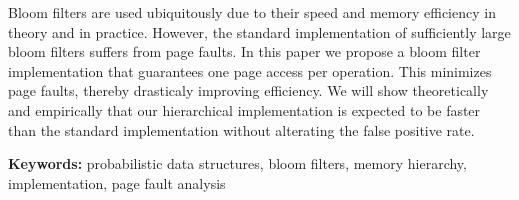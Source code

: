 Bloom filters \cite{Bloom} are used ubiquitously due to their speed and memory efficiency in theory and in practice.
However, the standard implementation of sufficiently large bloom filters suffers from page faults.
In this paper we propose a bloom filter implementation that guarantees one page access per operation. 
This minimizes page faults, thereby drasticaly improving efficiency.
We will show theoretically and empirically that our hierarchical implementation is expected to be faster than the standard implementation without alterating the false positive rate.

\noindent\textbf{Keywords:} probabilistic data structures, bloom filters, memory hierarchy, implementation, page fault analysis